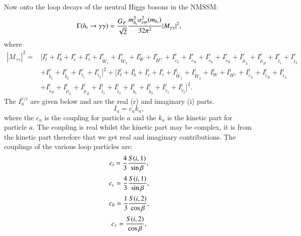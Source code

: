 \documentclass[final,3p,times]{elsarticle}
\begin{document}
Now onto the loop decays of the neutral Higgs bosons in the NMSSM:
\begin{equation} \label{hgamgamNMSSM}
\Gamma(h_i \rightarrow \gamma \gamma) = {G_{F} \over \sqrt{2}} {m_{h_i}^3 \alpha_{em}^2 (m_{h_i}) \over 32 \pi^2} |M_{\gamma \gamma}|^2,
\end{equation}
where 
\begin{equation}
\begin{aligned}
|M_{\gamma \gamma}|^2 = & \Big[I_{t}^{r} + I_{b}^{r} + I_{c}^{r} + I_{\tau}^{r} + I_{\tilde{W}_{1}}^{r} + I_{\tilde{W}_2}^{r} + I_{W}^{r} + I_{H^{\pm}}^{r} + I_{\tilde{c}_L}^{r} + I_{\tilde{c}_R}^{r} + I_{\tilde{s}_L}^{r} + I_{\tilde{s}_R}^{r} + I_{\tilde{\mu}_L}^{r} + I_{\tilde{\mu}_R}^{r} + I_{\tilde{t}_1}^{r} + I_{\tilde{t}_2}^{r} \\ & + I_{\tilde{b}_1}^{r} + I_{\tilde{b}_2}^{r} + I_{\tilde{\tau}_1}^{r} + I_{\tilde{\tau}_2}^{r}\Big]^2 + \Big[I_{t}^{i} + I_{b}^{i} + I_{c}^{i} + I_{\tau}^{i} + I_{\tilde{W}_{1}}^{i} + I_{\tilde{W}_2}^{i} + I_{W}^{i} + I_{H^{\pm}}^{i} + I_{\tilde{c}_L}^{i} + I_{\tilde{c}_R}^{i} + I_{\tilde{s}_L}^{i} \\ & + I_{\tilde{s}_R}^{i} + I_{\tilde{\mu}_L}^{i} + I_{\tilde{\mu}_R}^{i} + I_{\tilde{t}_1}^{i} + I_{\tilde{t}_2}^{i} + I_{\tilde{b}_1}^{i} + I_{\tilde{b}_2}^{i} + I_{\tilde{\tau}_1}^{i} + I_{\tilde{\tau}_2}^{i}\Big]^2.
\end{aligned}
\end{equation}
The $I_{a}^{r/i}$ are given below and are the real (r) and imaginary (i) parts.
\begin{equation}
I_{a} = c_{a}k_{a},
\end{equation}
where the $c_{a}$ is the coupling for particle $a$ and the $k_{a}$ is the kinetic part for particle $a$. The coupling is real whilst the kinetic part may be complex, it is from the kinetic part therefore that we get real and imaginary contributions. The couplings of the various loop particles are:
\begin{equation}
c_{t} = {4 \over 3}{S(i,1) \over \sin\beta},
\end{equation}
\begin{equation}
c_{c} = {4 \over 3}{S(i,1) \over \sin\beta},
\end{equation}
\begin{equation}
c_{b} = {1 \over 3}{S(i,2) \over \cos\beta},
\end{equation}
\begin{equation}
c_{\tau} = {S(i,2) \over \cos\beta},
\end{equation}
\end{document}

